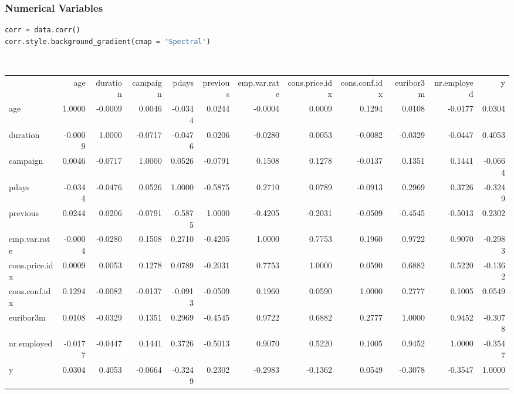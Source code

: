 \documentclass[11pt,a4paper]{article}
\begin{document}
    \subsubsection{Numerical Variables}
\begin{lstlisting}[language = Python]
corr = data.corr()
corr.style.background_gradient(cmap = 'Spectral')
\end{lstlisting}
    \quad \\
    {\tiny
        \begin{tabular}{lrrrrrrrrrrr}
            {} &     age &  duration &  campaign &   pdays &  previous &  emp.var.rate &  cons.price.idx &  cons.conf.idx &  euribor3m &  nr.employed &       y \\
            
            age            &  1.0000 &   -0.0009 &    0.0046 & -0.0344 &    0.0244 &       -0.0004 &          0.0009 &         0.1294 &     0.0108 &      -0.0177 &  0.0304 \\
            duration       & -0.0009 &    1.0000 &   -0.0717 & -0.0476 &    0.0206 &       -0.0280 &          0.0053 &        -0.0082 &    -0.0329 &      -0.0447 &  0.4053 \\
            campaign       &  0.0046 &   -0.0717 &    1.0000 &  0.0526 &   -0.0791 &        0.1508 &          0.1278 &        -0.0137 &     0.1351 &       0.1441 & -0.0664 \\
            pdays          & -0.0344 &   -0.0476 &    0.0526 &  1.0000 &   -0.5875 &        0.2710 &          0.0789 &        -0.0913 &     0.2969 &       0.3726 & -0.3249 \\
            previous       &  0.0244 &    0.0206 &   -0.0791 & -0.5875 &    1.0000 &       -0.4205 &         -0.2031 &        -0.0509 &    -0.4545 &      -0.5013 &  0.2302 \\
            emp.var.rate   & -0.0004 &   -0.0280 &    0.1508 &  0.2710 &   -0.4205 &        1.0000 &          0.7753 &         0.1960 &     0.9722 &       0.9070 & -0.2983 \\
            cons.price.idx &  0.0009 &    0.0053 &    0.1278 &  0.0789 &   -0.2031 &        0.7753 &          1.0000 &         0.0590 &     0.6882 &       0.5220 & -0.1362 \\
            cons.conf.idx  &  0.1294 &   -0.0082 &   -0.0137 & -0.0913 &   -0.0509 &        0.1960 &          0.0590 &         1.0000 &     0.2777 &       0.1005 &  0.0549 \\
            euribor3m      &  0.0108 &   -0.0329 &    0.1351 &  0.2969 &   -0.4545 &        0.9722 &          0.6882 &         0.2777 &     1.0000 &       0.9452 & -0.3078 \\
            nr.employed    & -0.0177 &   -0.0447 &    0.1441 &  0.3726 &   -0.5013 &        0.9070 &          0.5220 &         0.1005 &     0.9452 &       1.0000 & -0.3547 \\
            y              &  0.0304 &    0.4053 &   -0.0664 & -0.3249 &    0.2302 &       -0.2983 &         -0.1362 &         0.0549 &    -0.3078 &      -0.3547 &  1.0000 \\
        \end{tabular}
    } \\ \\
\end{document}
